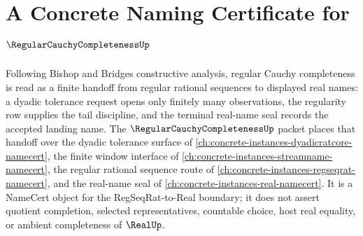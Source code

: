 \chapter{A Concrete Naming Certificate for $\RegularCauchyCompletenessUp$}
\label{ch:concrete-instances-regular-cauchy-completeness-namecert}

Following Bishop and Bridges constructive analysis, regular Cauchy completeness is read as a finite handoff from regular rational sequences to displayed real names: a dyadic tolerance request opens only finitely many observations, the regularity row supplies the tail discipline, and the terminal real-name seal records the accepted landing name. The $\RegularCauchyCompletenessUp$ packet places that handoff over the dyadic tolerance surface of \autoref{ch:concrete-instances-dyadicratcore-namecert}, the finite window interface of \autoref{ch:concrete-instances-streamname-namecert}, the regular rational sequence route of \autoref{ch:concrete-instances-regseqrat-namecert}, and the real-name seal of \autoref{ch:concrete-instances-real-namecert}. It is a NameCert object for the RegSeqRat-to-Real boundary; it does not assert quotient completion, selected representatives, countable choice, host real equality, or ambient completeness of $\RealUp$.

